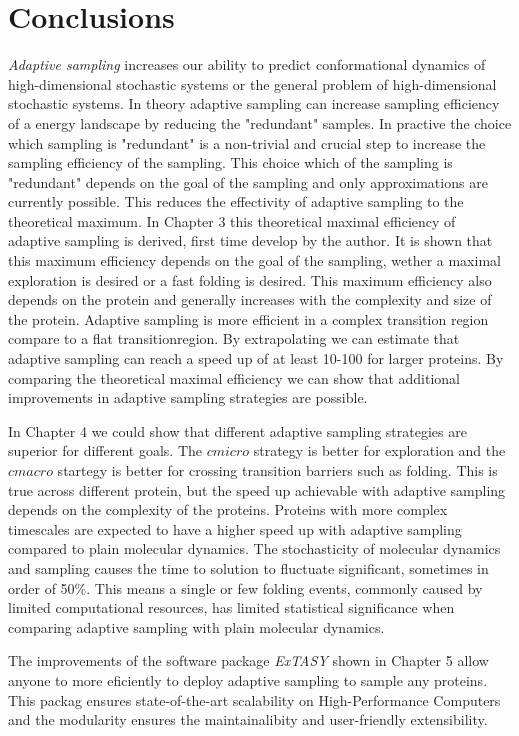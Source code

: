 \afterpage{\null\newpage}
\chapter{Conclusions}
\label{ch:conclude}
\emph{Adaptive sampling} increases our ability to predict conformational dynamics of high-dimensional stochastic systems or the general problem of high-dimensional stochastic systems. 
In theory adaptive sampling can increase sampling efficiency of a energy landscape by reducing the "redundant" samples. In practive the choice which sampling is "redundant" is a non-trivial and crucial step to increase the sampling efficiency of the sampling. This choice which of the sampling is "redundant" depends on the goal of the sampling and only approximations are currently possible. This reduces the effectivity of adaptive sampling to the theoretical maximum. 
In Chapter 3 this theoretical maximal efficiency of adaptive sampling is derived, first time develop by the author. It is shown that this maximum efficiency depends on the goal of the sampling, wether a maximal exploration is desired or a fast folding is desired. This maximum efficiency also depends on the protein and generally increases with the complexity and size of the protein. Adaptive sampling is more efficient in a complex transition region compare to a flat transitionregion. By extrapolating we can estimate that adaptive sampling can reach a speed up of at least 10-100 for larger proteins. By comparing the theoretical maximal efficiency we can show that additional improvements in adaptive sampling strategies are possible.

In Chapter 4 we could show that different adaptive sampling strategies are superior for different goals. The $cmicro$ strategy is better for exploration and the $cmacro$ startegy is better for crossing transition barriers such as folding. This is true across different protein, but the speed up achievable with adaptive sampling depends on the complexity of the proteins. Proteins with more complex timescales are expected to have a higher speed up with adaptive sampling compared to plain molecular dynamics. The stochasticity of molecular dynamics and sampling causes the time to solution to fluctuate significant, sometimes in order of 50\%. This means a single or few folding events, commonly caused by limited computational resources, has limited statistical significance when comparing adaptive sampling with plain molecular dynamics.

The improvements of the software package \emph{ExTASY} shown in Chapter 5 allow anyone to more eficiently to deploy adaptive sampling to sample any proteins. This packag ensures state-of-the-art scalability on High-Performance Computers and the modularity ensures the maintainalibity and user-friendly extensibility.

